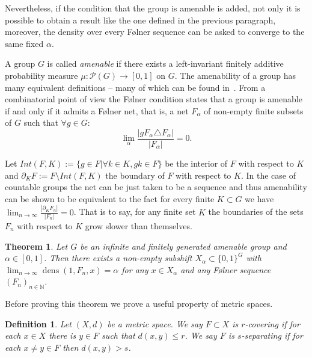 \documentclass[letterpaper]{article}
\theoremstyle{plain}
\newtheorem{theorem}{Theorem}[section]
\newtheorem{definition}{Definition}[section]
\def\NN{\mathbb{N}}
\def\dens{\operatorname{dens}}
\newcommand{\define}[1]{\emph{#1}}
\newcommand{\cor}[2][]{#2}
\begin{document}
	Nevertheless, if the condition that the group is amenable is added, not only it is possible to obtain a result like the one defined in the previous paragraph, moreover, the density over every F\o lner sequence can be asked to converge to the same fixed $\alpha$.
	
	\cor[!! this paragraph has been moved !!]{}
	A group $G$ is called \define{amenable} if there exists a left-invariant finitely additive probability measure $\mu: \mathcal{P}(G) \to [0,1]$ on $G$. The amenability of a group has many equivalent definitions -- many of which can be found in~\cite{ceccherini-SilbersteinC09}. From a combinatorial point of view the F\o lner condition states that a group is amenable if and only if it admits a F\o lner net, that is, a net $F_{\alpha}$ of non-empty finite subsets of $G$ such that $\forall g \in G$: $$ \lim_{\alpha}{ \frac{|gF_{\alpha} \triangle F_{\alpha}|}{|F_{\alpha}|}}= 0.$$
		
	Let $Int(F,K) := \{g \in F | \forall k \in K, gk \in F\}$ be the interior of $F$ with respect to $K$ and $\partial_K F := F \setminus Int(F,K)$ the boundary of $F$ with respect to $K$. In the case of countable groups the net can be just taken to be a sequence and thus amenability can be shown to be equivalent to the fact for every finite $K \subset G$ we have $\lim_{n \to \infty}{\frac{|\partial_K F_n|}{|F_n|}}=0$. That is to say, for any finite set $K$ the boundaries of the sets $F_n$ with respect to $K$ grow slower than themselves.
	
	\begin{theorem}
		\label{theorem.densities}
			Let $G$ be an infinite and finitely generated \cor{amenable} group and $\alpha \in [0,1]$. \cor[There is a non-empty subshift $X_{\alpha} \subset \{0,1\}^G$ such that for any $x \in X_{\alpha}$ and F\o lner sequence $(F_n)_{n \in \NN}$ then $\lim_{n \to \infty} \dens(1,F_n,x) = \alpha$]{Then there exists a non-empty subshift $X_{\alpha} \subset \{0,1\}^G$ with $\lim_{n \to \infty} \dens(1,F_n,x) = \alpha$ for any $x \in X_{\alpha}$ and any F\o lner sequence $(F_n)_{n \in \NN}$}.
	\end{theorem}
	
	Before proving this theorem we \cor[give a brief introduction to amenable groups in order to fix the notations and ]{} prove a useful property of metric spaces.
	
	
	
	\begin{definition}
		Let $(X,d)$ be a metric space. We say $F \subset X$ is \define{$r$-covering} if for each $x \in X$ there is $y \in F$ such that $d(x,y) \leq r$. We say $F$ is \define{$s$-separating} if for each $x \neq y \in F$ then $d(x,y) > s$.
	\end{definition}
	
\end{document}
